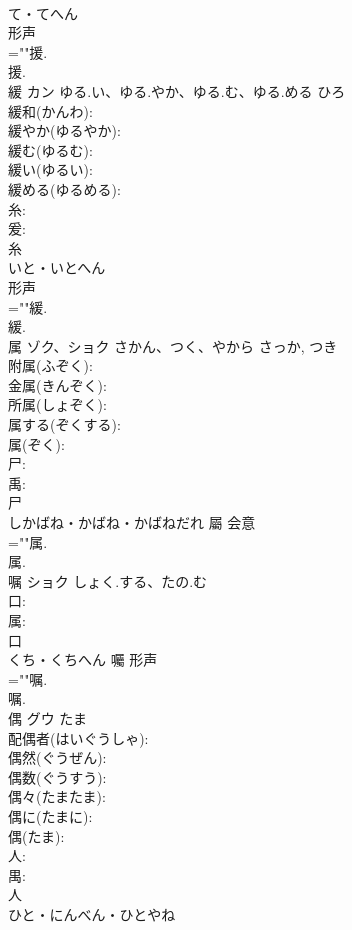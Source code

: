 \documentclass[8pt]{extreport}
\begin{document}
\begin{CJK}{UTF8}{min}
\\	て・てへん	
\\	形声 
\\	=""援.
\\	援.
\\	緩	カン	ゆる.い、ゆる.やか、ゆる.む、ゆる.める	ひろ	
\\	緩和(かんわ): 
\\	緩やか(ゆるやか): 
\\	緩む(ゆるむ): 
\\	緩い(ゆるい): 
\\	緩める(ゆるめる): 
\\	糸: 
\\	爰: 
\\	糸	
\\	いと・いとへん	
\\	形声 
\\	=""緩.
\\	緩.
\\	属	ゾク、ショク	さかん、つく、やから	さっか, つき	
\\	附属(ふぞく): 
\\	金属(きんぞく): 
\\	所属(しょぞく): 
\\	属する(ぞくする): 
\\	属(ぞく): 
\\	尸: 
\\	禹: 
\\	尸	
\\	しかばね・かばね・かばねだれ	屬	会意 
\\	=""属.
\\	属.
\\	嘱	ショク	しょく.する、たの.む		
\\	口: 
\\	属: 
\\	口	
\\	くち・くちへん	囑	形声 
\\	=""嘱.
\\	嘱.
\\	偶	グウ	たま		
\\	配偶者(はいぐうしゃ): 
\\	偶然(ぐうぜん): 
\\	偶数(ぐうすう): 
\\	偶々(たまたま): 
\\	偶に(たまに): 
\\	偶(たま): 
\\	人: 
\\	禺: 
\\	人	
\\	ひと・にんべん・ひとやね	

\end{CJK}
\end{document}
